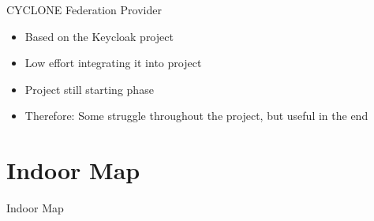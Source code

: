\documentclass[11pt]{beamer}
\begin{document}
\begin{frame}{CYCLONE Federation Provider}

  \begin{itemize}

    \item Based on the Keycloak project
    \item Low effort integrating it into project
    \item Project still starting phase
    \item Therefore: Some struggle throughout the project, but useful in the end

  \end{itemize}

\end{frame}

\section{Indoor Map}

\begin{frame}{}

  \begin{center}

    {\Huge Indoor Map}

  \end{center}

\end{frame}
\end{document}
